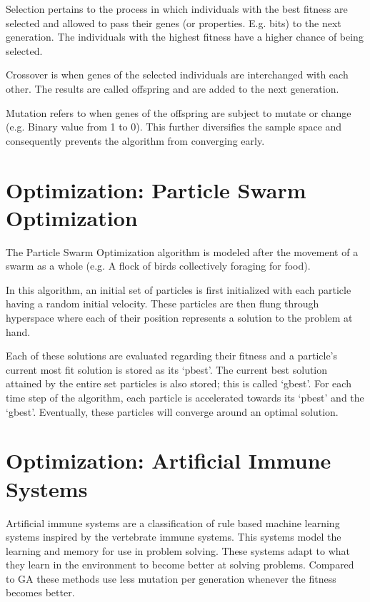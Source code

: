 \par Selection pertains to the process in which individuals with the best fitness are selected and allowed to pass their genes (or properties. E.g. bits) to the next generation. The individuals with the highest fitness have a higher chance of being selected.

\par Crossover is when genes of the selected individuals are interchanged with each other. The results are called offspring and are added to the next generation.

\par Mutation refers to when genes of the offspring are subject to mutate or change (e.g. Binary value from 1 to 0). This further diversifies the sample space and consequently prevents the algorithm from converging early.

\section{Optimization: Particle Swarm Optimization}
\par The Particle Swarm Optimization \cite{eberhart_kennedy_1995} algorithm is modeled after the movement of a swarm as a whole (e.g. A flock
of birds collectively foraging for food).

\par In this algorithm, an initial set of particles is first initialized with each particle having a random initial velocity. These particles are then flung through hyperspace where each of their position
represents a solution to the problem at hand.

Each of these solutions are evaluated regarding their fitness and a particle's
current most fit solution is stored as its `pbest'. The current best solution attained by the entire set particles is also stored; this is called `gbest'. For each time step of the algorithm, each particle is accelerated towards its `pbest' and the `gbest'. Eventually, these particles will converge around an optimal solution.

\section{Optimization: Artificial Immune Systems}
\par Artificial immune systems are a classification of rule based machine learning systems inspired by the vertebrate immune systems. This systems model the learning and memory for use in problem solving. These systems adapt to what they learn in the environment to become better at solving problems. Compared to GA these methods use less mutation per generation whenever the fitness becomes better.

